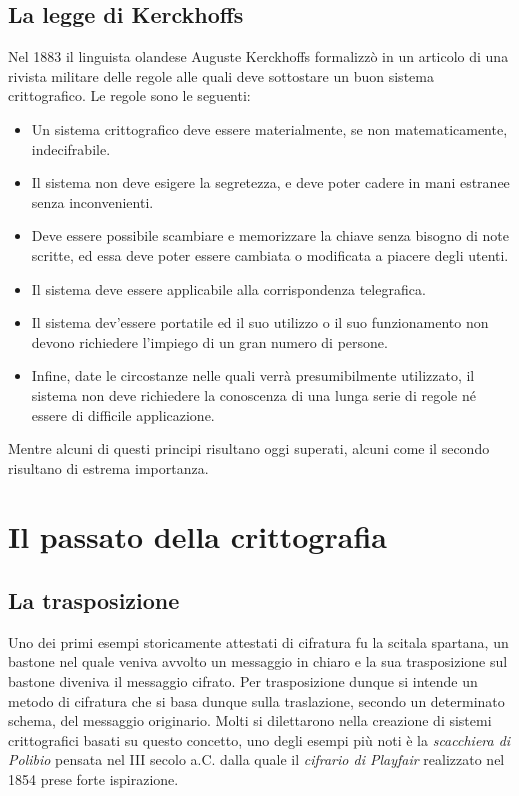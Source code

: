 \documentclass[a4paper, 12pt]{article}
\begin{document}
\subsection{La legge di Kerckhoffs}\label{kerck}
Nel 1883 il linguista olandese Auguste Kerckhoffs formalizzò in un articolo di una rivista militare delle regole alle quali deve sottostare un buon sistema crittografico. Le regole sono le seguenti:
\begin{itemize}
	\item Un sistema crittografico deve essere materialmente, se non matematicamente, indecifrabile.
	\item Il sistema non deve esigere la segretezza, e deve poter cadere in mani estranee senza inconvenienti.
	\item Deve essere possibile scambiare e memorizzare la chiave senza bisogno di note scritte, ed essa deve poter essere cambiata o modificata a piacere degli utenti.
	\item Il sistema deve essere applicabile alla corrispondenza telegrafica.
	\item Il sistema dev'essere portatile ed il suo utilizzo o il suo funzionamento non devono richiedere l'impiego di un gran numero di persone.
	\item Infine, date le circostanze nelle quali verrà presumibilmente utilizzato, il sistema non deve richiedere la conoscenza di una lunga serie di regole né essere di difficile applicazione.
\end{itemize}
Mentre alcuni di questi principi risultano oggi superati, alcuni come il secondo risultano di estrema importanza.
\section{Il passato della crittografia}
\subsection{La trasposizione}
Uno dei primi esempi storicamente attestati di cifratura fu la scitala spartana, un bastone nel quale veniva avvolto un messaggio in chiaro e la sua trasposizione sul bastone diveniva il messaggio cifrato. Per trasposizione dunque si intende un metodo di cifratura che si basa dunque sulla traslazione, secondo un determinato schema, del messaggio originario.\newline
Molti si dilettarono nella creazione di sistemi crittografici basati su questo concetto, uno degli esempi più noti è la \textit{scacchiera di Polibio} pensata nel III secolo a.C. dalla quale il \textit{cifrario di Playfair} realizzato nel 1854 prese forte ispirazione.
\end{document}
